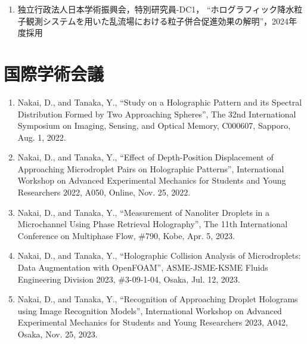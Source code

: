 \begin{enumerate}
    \renewcommand{\labelenumi}{(\arabic{enumi})}
    \item 独立行政法人日本学術振興会，特別研究員-DC1， “ホログラフィック降水粒子観測システムを用いた乱流場における粒子併合促進効果の解明”，2024年度採用
\end{enumerate}

\section*{国際学術会議}
\begin{enumerate}
\renewcommand{\labelenumi}{(\arabic{enumi})}
    \item Nakai, D., and Tanaka, Y., “Study on a Holographic Pattern and its Spectral Distribution Formed by Two Approaching Spheres”, The 32nd International Symposium on Imaging, Sensing, and Optical Memory, C000607, Sapporo, Aug. 1, 2022.
    \item Nakai, D., and Tanaka, Y., “Effect of Depth-Position Displacement of Approaching Microdroplet Pairs on Holographic Patterns”, International Workshop on Advanced Experimental Mechanics for Students and Young Researchers 2022, A050, Online, Nov. 25, 2022.
    \item Nakai, D., and Tanaka, Y., “Measurement of Nanoliter Droplets in a Microchannel Using Phase Retrieval Holography”, The 11th International Conference on Multiphase Flow, \#790, Kobe, Apr. 5, 2023.
    \item Nakai, D., and Tanaka, Y., “Holographic Collision Analysis of Microdroplets: Data Augmentation with OpenFOAM”, ASME-JSME-KSME Fluids Engineering Division 2023, \#3-09-1-04, Osaka, Jul. 12, 2023.
    \item Nakai, D., and Tanaka, Y., “Recognition of Approaching Droplet Holograms using Image Recognition Models”, International Workshop on Advanced Experimental Mechanics for Students and Young Researchers 2023, A042, Osaka, Nov. 25, 2023.
\end{enumerate}

